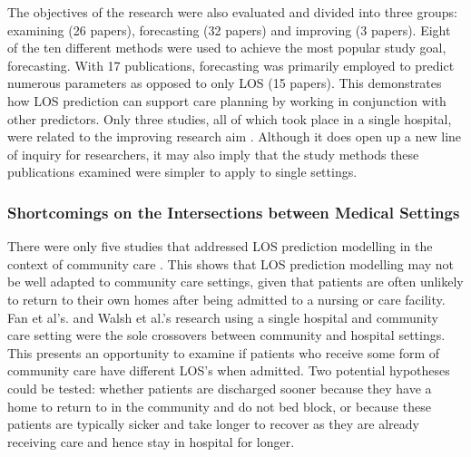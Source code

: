 \documentclass[../thesis.tex]{subfiles}
\begin{document}
The objectives of the research were also evaluated and divided into three groups: examining (26 papers), forecasting (32 papers) and improving (3 papers). Eight of the ten different methods were used to achieve the most popular study goal, forecasting. With 17 publications, forecasting was primarily employed to predict numerous parameters as opposed to only LOS (15 papers). This demonstrates how LOS prediction can support care planning by working in conjunction with other predictors. Only three studies, all of which took place in a single hospital, were related to the improving research aim \cite{Hamdani,Basic2015,Walsh2020}. Although it does open up a new line of inquiry for researchers, it may also imply that the study methods these publications examined were simpler to apply to single settings.
 

\subsubsection{Shortcomings on the Intersections between Medical Settings}

There were only five studies that addressed LOS prediction modelling in the context of community care \cite{Fan2021,Hoben2019,Johnson2011,Walsh2020,Welberry}. This shows that LOS prediction modelling may not be well adapted to community care settings, given that patients are often unlikely to return to their own homes after being admitted to a nursing or care facility. Fan et al's. \cite{Fan2021} and Walsh et al.'s \cite{Walsh2020} research using a single hospital and community care setting were the sole crossovers between community and hospital settings. This presents an opportunity to examine if patients who receive some form of community care have different LOS's when admitted. Two potential hypotheses could be tested: whether patients are discharged sooner because they have a home to return to in the community and do not bed block, or because these patients are typically sicker and take longer to recover as they are already receiving care and hence stay in hospital for longer.
\end{document}
